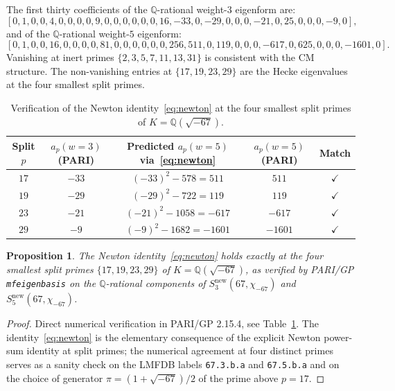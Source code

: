 \documentclass[11pt,a4paper]{amsart}
\providecommand{\Q}{\mathbb{Q}}
\newtheorem{proposition}[theorem]{Proposition}
\theoremstyle{definition}
\begin{document}
The first thirty coefficients of the $\Q$-rational weight-$3$ eigenform are:
\[
[0, 1, 0, 0, 4, 0, 0, 0, 0, 9, 0, 0, 0, 0, 0, 0, 16, -33, 0, -29, 0, 0, 0, -21, 0, 25, 0, 0, 0, -9, 0],
\]
and of the $\Q$-rational weight-$5$ eigenform:
\[
[0, 1, 0, 0, 16, 0, 0, 0, 0, 81, 0, 0, 0, 0, 0, 0, 256, 511, 0, 119, 0, 0, 0, -617, 0, 625, 0, 0, 0, -1601, 0].
\]
Vanishing at inert primes $\{2, 3, 5, 7, 11, 13, 31\}$ is consistent with the
CM structure. The non-vanishing entries at $\{17, 19, 23, 29\}$ are the Hecke
eigenvalues at the four smallest split primes.

\begin{table}[h]\label{tab:newton}
\centering
\begin{tabular}{ccccc}
\toprule
Split $p$ & $a_{p}(w=3)$ (PARI) & Predicted $a_{p}(w=5)$ via~\eqref{eq:newton} & $a_{p}(w=5)$ (PARI) & Match \\
\midrule
$17$ & $-33$ & $(-33)^{2} - 578 = 511$ & $511$ & $\checkmark$ \\
$19$ & $-29$ & $(-29)^{2} - 722 = 119$ & $119$ & $\checkmark$ \\
$23$ & $-21$ & $(-21)^{2} - 1058 = -617$ & $-617$ & $\checkmark$ \\
$29$ & $-9$ & $(-9)^{2} - 1682 = -1601$ & $-1601$ & $\checkmark$ \\
\bottomrule
\end{tabular}
\caption{Verification of the Newton identity~\eqref{eq:newton} at the four
smallest split primes of $K = \Q(\sqrt{-67})$.}
\end{table}

\begin{proposition}\label{prop:newton-verified}
The Newton identity~\eqref{eq:newton} holds exactly at the four smallest split
primes $\{17, 19, 23, 29\}$ of $K = \Q(\sqrt{-67})$, as verified by PARI/GP
\texttt{mfeigenbasis} on the $\Q$-rational components of
$S_{3}^{\mathrm{new}}(67, \chi_{-67})$ and $S_{5}^{\mathrm{new}}(67, \chi_{-67})$.
\end{proposition}

\begin{proof}
Direct numerical verification in PARI/GP 2.15.4, see Table~\ref{tab:newton}.
The identity~\eqref{eq:newton} is the elementary consequence of the explicit
Newton power-sum identity at split primes; the numerical agreement at four
distinct primes serves as a sanity check on the LMFDB labels
\texttt{67.3.b.a} and \texttt{67.5.b.a} and on the choice of generator
$\pi = (1 + \sqrt{-67})/2$ of the prime above $p = 17$.
\end{proof}
\end{document}
